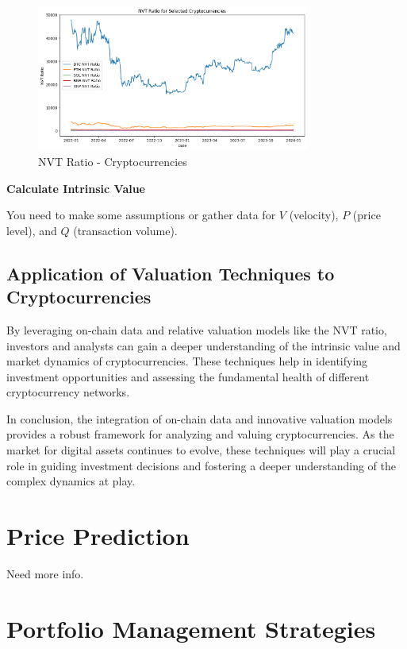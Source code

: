 \documentclass{ledger}
\begin{document}
\begin{figure}
    \centering
    \includegraphics[width=0.8\textwidth]{./code/valuation-techniques/nvt_ratio.png}
    \caption{NVT Ratio - Cryptocurrencies}
    \label{fig:beta}
\end{figure}

\textbf{Calculate Intrinsic Value}

You need to make some assumptions or gather data for $V$ (velocity), $P$ (price level), and $Q$ (transaction volume).


\subsection{Application of Valuation Techniques to Cryptocurrencies}

By leveraging on-chain data and relative valuation models like the NVT ratio, investors and analysts can gain a deeper understanding of the intrinsic value and market dynamics of cryptocurrencies. These techniques help in identifying investment opportunities and assessing the fundamental health of different cryptocurrency networks.

In conclusion, the integration of on-chain data and innovative valuation models provides a robust framework for analyzing and valuing cryptocurrencies. As the market for digital assets continues to evolve, these techniques will play a crucial role in guiding investment decisions and fostering a deeper understanding of the complex dynamics at play.



\section{Price Prediction}

Need more info.

\section{Portfolio Management Strategies}
\end{document}
